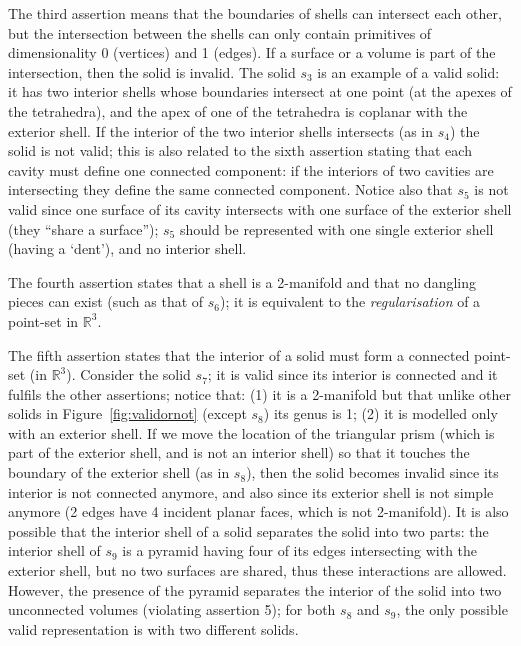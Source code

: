The third assertion means that the boundaries of shells can intersect each other, but the intersection between the shells can only contain primitives of dimensionality 0 (vertices) and 1 (edges).
If a surface or a volume is part of the intersection, then the solid is invalid.
The solid $s_3$ is an example of a valid solid: it has two interior shells whose boundaries intersect at one point (at the apexes of the tetrahedra), and the apex of one of the tetrahedra is coplanar with the exterior shell.
If the interior of the two interior shells intersects (as in $s_4$) the solid is not valid; this is also related to the sixth assertion stating that each cavity must define one connected component: if the interiors of two cavities are intersecting they define the same connected component.
Notice also that $s_5$ is not valid since one surface of its cavity intersects with one surface of the exterior shell (they ``share a surface''); $s_5$ should be represented with one single exterior shell (having a `dent'), and no interior shell.

The fourth assertion states that a shell is a 2-manifold and that no dangling pieces can exist (such as that of $s_6$); it is equivalent to the \emph{regularisation} of a point-set in $\mathbb{R}^3$.

The fifth assertion states that the interior of a solid must form a connected point-set (in $\mathbb{R}^3$).
Consider the solid $s_7$; it is valid since its interior is connected and it fulfils the other assertions; notice that: (1) it is a 2-manifold but that unlike other solids in Figure~\ref{fig:validornot} (except $s_8$) its genus is 1; (2) it is modelled only with an exterior shell.
If we move the location of the triangular prism (which is part of the exterior shell, and is not an interior shell) so that it touches the boundary of the exterior shell (as in $s_8$), then the solid becomes invalid since its interior is not connected anymore, and also since its exterior shell is not simple anymore (2 edges have 4 incident planar faces, which is not 2-manifold).
It is also possible that the interior shell of a solid separates the solid into two parts: the interior shell of $s_9$ is a pyramid having four of its edges intersecting with the exterior shell, but no two surfaces are shared, thus these interactions are allowed.
However, the presence of the pyramid separates the interior of the solid into two unconnected volumes (violating assertion 5); for both $s_8$ and $s_9$, the only possible valid representation is with two different solids.

